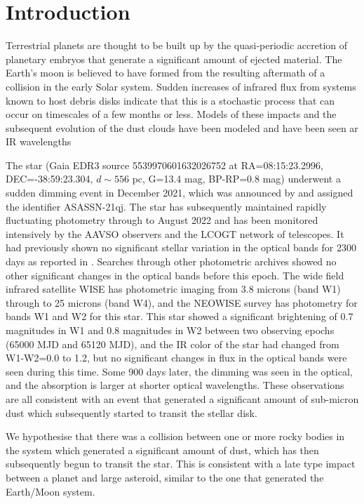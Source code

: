 \documentclass{aa}
\begin{document}
   \section{Introduction}

Terrestrial planets are thought to be built up by the quasi-periodic accretion of planetary embryos that generate a significant amount of ejected material.
%
The Earth's moon is believed to have formed from the resulting aftermath of a collision in the early Solar system.
%
Sudden increases of infrared flux from systems known to host debris disks indicate that this is a stochastic process that can occur on timescales of a few months or less.
%
Models of these impacts and the subsequent evolution of the dust clouds have been modeled \citep{Jackson12,Jackson14} and have been seen ar IR wavelengths \citep{Su19,Su22}

   The star (Gaia EDR3 source 5539970601632026752 at RA=08:15:23.2996, DEC=-38:59:23.304, $d\sim 556$ pc, G=13.4 mag, BP-RP=0.8 mag) underwent a sudden dimming event in December 2021, which was announced by \citet{RizzoSmith21} and assigned the identifier ASASSN-21qj.
   The star has subsequently maintained rapidly fluctuating photometry through to August 2022 \citep{RizzoSmith22} and has been monitored intensively by the AAVSO observers and the LCOGT network of telescopes.
   It had previously shown no significant stellar variation in the optical bands for 2300 days as reported in \citet{RizzoSmith21}.
   Searches through other photometric archives showed no other significant changes in the optical bands before this epoch.
   The wide field infrared satellite WISE has photometric imaging from 3.8 microns (band W1) through to 25 microns (band W4), and the NEOWISE survey has photometry for bands W1 and W2 for this star.
   This star showed a significant brightening of 0.7 magnitudes in W1 and 0.8 magnitudes in W2 between two observing epochs (65000 MJD and 65120 MJD), and the IR color of the star had changed from W1-W2=0.0 to 1.2, but no significant changes in flux in the optical bands were seen during this time.
   Some 900 days later, the dimming was seen in the optical, and the absorption is larger at shorter optical wavelengths.
   These observations are all consistent with an event that generated a significant amount of sub-micron dust which subsequently started to transit the stellar disk.

   We hypothesise that there was a collision between one or more rocky bodies in the system which generated a significant amount of dust, which has then subsequently begun to transit the star.
   This is consistent with a late type impact between a planet and large asteroid, similar to the one that generated the Earth/Moon system.
\end{document}
